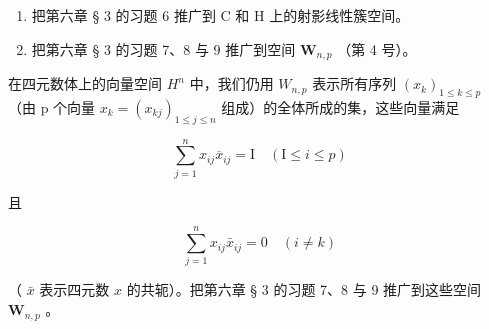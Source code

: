 \begin{enumerate}
\def\labelenumi{\arabic{enumi})}
\setcounter{enumi}{6}
\item
  把第六章 § 3 的习题 6 推广到 C 和 H 上的射影线性簇空间。
\item
  把第六章 § 3 的习题 7、8 与 9 推广到空间 \(\mathbf{W}_{n,p}\) （第 4 号）。
\end{enumerate}

在四元数体上的向量空间 \(H^{n}\) 中，我们仍用 \(W_{n,p}\) 表示所有序列 \((x_{k})_{1\leqslant k\leqslant p}\) （由 p 个向量 \(x_{k}=(x_{kj})_{1\leqslant j\leqslant n}\) 组成）的全体所成的集，这些向量满足

\[
\sum_ {j = 1} ^ {n} x _ {i j} \overline {{{x}}} _ {i j} = \mathrm{I} \quad (\mathrm{I} \leqslant i \leqslant p)
\]

且

\[
\sum_ {j = 1} ^ {n} x _ {i j} \bar {x} _ {i j} = 0 \quad (i \neq k)
\]

（ \(\bar{x}\) 表示四元数 \(x\) 的共轭）。把第六章 § 3 的习题 7、8 与 9 推广到这些空间 \(\mathbf{W}_{n,p}\) 。


